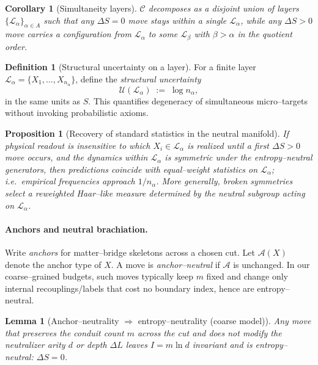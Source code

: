 \documentclass[11pt]{article}
\theoremstyle{plain}
\newtheorem{lemma}[theorem]{Lemma}
\newtheorem{proposition}[theorem]{Proposition}
\newtheorem{corollary}[theorem]{Corollary}
\theoremstyle{definition}
\newtheorem{definition}[theorem]{Definition}
\begin{document}
\begin{corollary}[Simultaneity layers]\label{cor:simul}
  $\mathcal{C}$ decomposes as a disjoint union of layers $\{\mathcal{L}_\alpha\}_{\alpha\in A}$ such that any $\Delta S=0$ move stays within a single $\mathcal{L}_\alpha$, while any $\Delta S>0$ move carries a configuration from $\mathcal{L}_\alpha$ to some $\mathcal{L}_\beta$ with $\beta>\alpha$ in the quotient order.
\end{corollary}

\begin{definition}[Structural uncertainty on a layer]
  For a finite layer $\mathcal{L}_\alpha=\{X_1,\dots,X_{n_\alpha}\}$, define the \emph{structural uncertainty}
  \[
    \mathcal{U}(\mathcal{L}_\alpha)\;:=\;\log n_\alpha,
  \]
  in the same units as $S$.  This quantifies degeneracy of simultaneous micro–targets without invoking probabilistic axioms.
\end{definition}

\begin{proposition}[Recovery of standard statistics in the neutral manifold]
  If physical readout is insensitive to which $X_i\in\mathcal{L}_\alpha$ is realized until a first $\Delta S>0$ move occurs, and the dynamics within $\mathcal{L}_\alpha$ is symmetric under the entropy–neutral generators, then predictions coincide with equal–weight statistics on $\mathcal{L}_\alpha$; i.e.\ empirical frequencies approach $1/n_\alpha$.  More generally, broken symmetries select a reweighted Haar–like measure determined by the neutral subgroup acting on $\mathcal{L}_\alpha$.
\end{proposition}

\paragraph{Anchors and neutral brachiation.}
Write \emph{anchors} for matter–bridge skeletons across a chosen cut.  Let $\mathcal{A}(X)$ denote the anchor type of $X$.  A move is \emph{anchor–neutral} if $\mathcal{A}$ is unchanged.  In our coarse–grained budgets, such moves typically keep $m$ fixed and change only internal recouplings/labels that cost no boundary index, hence are entropy–neutral.

\begin{lemma}[Anchor–neutrality $\Rightarrow$ entropy–neutrality (coarse model)]
  Any move that preserves the conduit count $m$ across the cut and does not modify the neutralizer arity $d$ or depth $\Delta L$ leaves $I=m\ln d$ invariant and is entropy–neutral: $\Delta S=0$.
\end{lemma}
\end{document}
